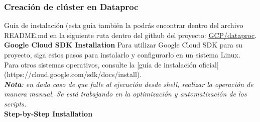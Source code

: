\documentclass{article}
\begin{document}
\subsubsection{Creación de clúster en Dataproc}

Guía de instalación (esta guía también la podrás encontrar dentro del archivo README.md en la siguiente ruta dentro del github del proyecto: \href{https://github.com/Anonymate054/MCD-BigData/tree/main/GCP/dataproc}{GCP/dataproc}.\\

\textbf{Google Cloud SDK Installation}
Para utilizar Google Cloud SDK para su proyecto, siga estos pasos para instalarlo y configurarlo en un sistema Linux. Para otros sistemas operativos, consulte la [guía de instalación oficial](https://cloud.google.com/sdk/docs/install).\\

\textit{\textbf{Nota}: en dado caso de que falle al ejecución desde shell, realizar la operación de manera manual. Se está trabajando en la optimización y automatización de los scripts.} \\

\textbf{Step-by-Step Installation}
\end{document}
